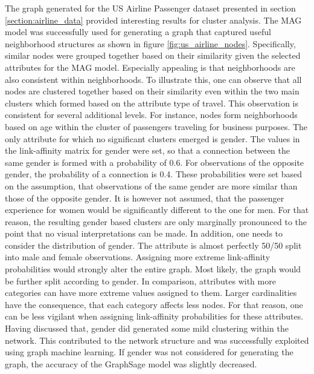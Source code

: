   The graph generated for the US Airline Passenger dataset presented in section
  \ref{section:airline_data} provided interesting results for cluster analysis. 
  The MAG model was successfully used for generating a graph that captured 
  useful neighborhood structures as shown in figure \ref{fig:us_airline_nodes}. 
  Specifically, similar nodes were grouped together based on their similarity 
  given the selected attributes for the MAG model. Especially appealing is that 
  neighborhoods are also consistent within neighborhoods. To illustrate this, 
  one can observe that all nodes are clustered together based on their 
  similarity even within the two main clusters which formed based on the 
  attribute type of travel. This observation is consistent for several 
  additional levels. For instance, nodes form neighborhoods based on age within 
  the cluster of passengers traveling for business purposes. The only attribute 
  for which no significant clusters emerged is gender. The values in the 
  link-affinity matrix for gender were set, so that a connection between the
  same gender is formed with a probability of 0.6. For observations of the
  opposite gender, the probability of a connection is 0.4. These probabilities 
  were set based on the assumption, that observations of the same gender are 
  more similar than those of the opposite gender. It is however not assumed, 
  that the passenger experience for women would be significantly different to 
  the one for men. For that reason, the resulting gender based clusters are
  only marginally pronounced to the point that no visual interpretations can be
  made. In addition, one needs to consider the distribution of gender. The
  attribute is almost perfectly 50/50 split into male and female observations.
  Assigning more extreme link-affinity probabilities would strongly alter the
  entire graph. Most likely, the graph would be further split according to
  gender. In comparison, attributes with more categories can have more extreme
  values assigned to them. Larger cardinalities have the consequence, that each
  category affects less nodes. For that reason, one can be less vigilant when
  assigning link-affinity probabilities for these attributes. Having discussed
  that, gender did generated some mild clustering within the network. This 
  contributed to the network structure and was successfully exploited using 
  graph machine learning. If gender was not considered for generating the graph, 
  the accuracy of the GraphSage model was slightly decreased. \\

